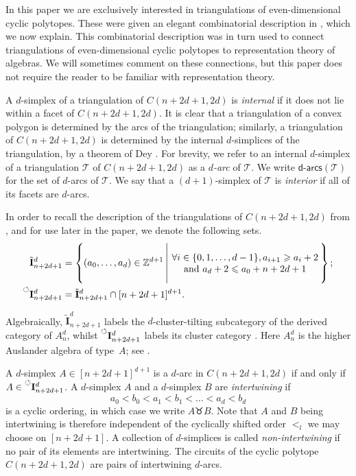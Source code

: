 \documentclass[ALCO,Unicode,published]{cedram}
\newcommand{\nonconsec}[2]{\prescript{\circlearrowleft}{}{\mathbf{I}_{#1}^{#2}}}
\newcommand{\derset}[2]{{\tilde{\mathbf{I}}_{#1}^{#2}}}
\newcommand{\st}{\,\middle\vert\,} %
\newcommand{\set}[1]{\left\{#1\right\}} %
\newcommand{\darcs}[1]{\mathsf{d}\text{-}\mathsf{arcs}(#1)} %
\newcommand{\swr}{\taurus} %
\begin{document}
In this paper we are exclusively interested in triangulations of even-dimensional cyclic polytopes. These were given an elegant combinatorial description in \cite{ot}, which we now explain. This combinatorial description was in turn used to connect triangulations of even-dimensional cyclic polytopes to representation theory of algebras. We will sometimes comment on these connections, but this paper does not require the reader to be familiar with representation theory.

A $d$-simplex of a triangulation of $C(n + 2d + 1, 2d)$ is \emph{internal} if it does not lie within a facet of $C(n + 2d + 1, 2d)$. It is clear that a triangulation of a convex polygon is determined by the arcs of the triangulation; similarly, a triangulation of $C(n + 2d + 1,2d)$ is determined by the internal $d$-simplices of the triangulation, by a theorem of Dey \cite{dey}. For brevity, we refer to an internal $d$-simplex of a triangulation $\mathcal{T}$ of $C(n + 2d + 1, 2d)$ as a \emph{$d$-arc} of $\mathcal{T}$. We write $\darcs{\mathcal{T}}$ for the set of $d$-arcs of $\mathcal{T}$. We say that a $(d + 1)$-simplex of $\mathcal{T}$ is \emph{interior} if all of its facets are $d$-arcs.

In order to recall the description of the triangulations of $C(n + 2d + 1,2d)$ from \cite{ot}, and for use later in the paper, we denote the following sets.
\begin{align*}
\derset{n + 2d + 1}{d} &= \set{(a_{0},\dots,a_{d}) \in \mathbb{Z}^{d+1} \st \parbox{5.5cm}{\begin{center}$\forall i \in \{0, 1, \dots ,d - 1\}, a_{i + 1} \geqslant a_{i} + 2 $\\  and  $a_{d} + 2 \leqslant a_{0} + n + 2d + 1$\end{center}}}; \\
\nonconsec{n + 2d + 1}{d} &= \derset{n + 2d + 1}{d} \cap [n + 2d + 1]^{d + 1}.
\end{align*}

\begin{rema}
Algebraically, $\derset{n + 2d + 1}{d}$ labels the $d$-cluster-tilting subcategory of the derived category of $A_{n}^{d}$, whilst $\nonconsec{n + 2d + 1}{d}$ labels its cluster category \cite{ot}. Here $A_{n}^{d}$ is the higher Auslander algebra of type~$A$; see \cite{iy-clus}.
\end{rema}

A $d$-simplex $A \in [n + 2d + 1]^{d + 1}$ is a $d$-arc in $C(n + 2d + 1, 2d)$ if and only if $A \in \nonconsec{n + 2d + 1}{d}$. A $d$-simplex $A$ and a $d$-simplex $B$ are \emph{intertwining} if \[ a_{0} < b_{0} < a_{1} < b_{1} < \dots < a_{d} < b_{d}\] is a cyclic ordering, in which case we write $A \swr B$. Note that $A$ and $B$ being intertwining is therefore independent of the cyclically shifted order $<_{l}$ we may choose on $[n + 2d + 1]$. A collection of $d$-simplices is called \emph{non-intertwining} if no pair of its elements are intertwining. The circuits of the cyclic polytope $C(n + 2d + 1, 2d)$ are pairs of intertwining $d$-arcs.
\end{document}
